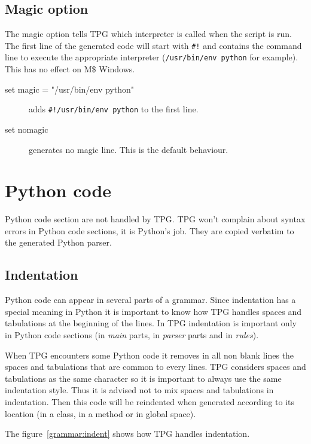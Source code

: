 \subsection{Magic option}

The magic option tells TPG which interpreter is called when the script is run.
The first line of the generated code will start with \verb$#!$ and contains the command line to execute
the appropriate interpreter (\verb$/usr/bin/env python$ for example).
This has no effect on M\$ Windows.

\begin{description}
	\item [set magic = "/usr/bin/env python"] adds \verb$#!/usr/bin/env python$ to the first line.
	\item [set nomagic] generates no magic line. This is the default behaviour.
\end{description}

\section{Python code}
\label{grammar:code}

Python code section are not handled by TPG.
TPG won't complain about syntax errors in Python code sections, it is Python's job.
They are copied verbatim to the generated Python parser.

\subsection{Indentation}

Python code can appear in several parts of a grammar.
Since indentation has a special meaning in Python it is important to know how TPG handles spaces and tabulations at the beginning of the lines.
In TPG indentation is important only in Python code sections (in \emph{main} parts, in \emph{parser} parts and in \emph{rules}).

When TPG encounters some Python code it removes in all non blank lines the spaces and tabulations that are common to every lines. TPG considers spaces and tabulations as the same character so it is important to always use the same indentation style. Thus it is advised not to mix spaces and tabulations in indentation.
Then this code will be reindented when generated according to its location (in a class, in a method or in global space).

The figure~\ref{grammar:indent} shows how TPG handles indentation.


